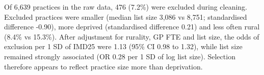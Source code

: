 Of 6,639 practices in the raw data, 476 (7.2\%) were excluded during cleaning. Excluded practices were smaller (median list size 3,086 vs 8,751; standardised difference -0.90), more deprived (standardised difference 0.21) and less often rural (8.4\% vs 15.3\%). After adjustment for rurality, GP FTE and list size, the odds of exclusion per 1 SD of IMD25 were 1.13 (95\% CI 0.98 to 1.32), while list size remained strongly associated (OR 0.28 per 1 SD of log list size). Selection therefore appears to reflect practice size more than deprivation.
